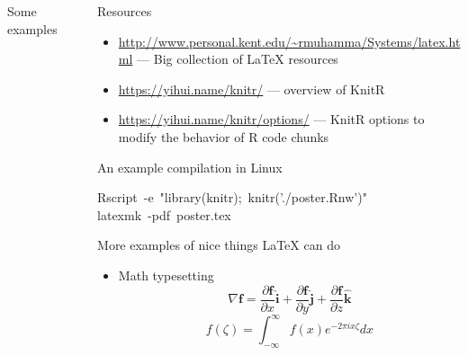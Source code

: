 \documentclass[final]{beamer}\usepackage[]{graphicx}\usepackage[]{color}
\makeatletter
\newcommand{\hlstr}[1]{\textcolor[rgb]{0.192,0.494,0.8}{#1}}%
\newcommand{\hlopt}[1]{\textcolor[rgb]{0,0,0}{#1}}%
\newcommand{\hlstd}[1]{\textcolor[rgb]{0.345,0.345,0.345}{#1}}%
\newenvironment{kframe}{%
 \def\at@end@of@kframe{}%
 \ifinner\ifhmode%
  \def\at@end@of@kframe{\end{minipage}}%
  \begin{minipage}{\columnwidth}%
 \fi\fi%
 \def\FrameCommand##1{\hskip\@totalleftmargin \hskip-\fboxsep
 \colorbox{shadecolor}{##1}\hskip-\fboxsep
     \hskip-\linewidth \hskip-\@totalleftmargin \hskip\columnwidth}%
 \MakeFramed {\advance\hsize-\width
   \@totalleftmargin\z@ \linewidth\hsize
   \@setminipage}}%
 {\par\unskip\endMakeFramed%
 \at@end@of@kframe}
\newenvironment{knitrout}{}{} %
\newlength{\sepwid}
\newlength{\onecolwid}
\newlength{\twocolwid}
\makeatother
\begin{document}
\begin{frame}[t, fragile]
\begin{columns}[T]
\begin{column}{\twocolwid}
\begin{block}{Some examples}
\begin{knitrout}
\end{knitrout}
				\end{block}
		\end{column} %
		\begin{column}{\sepwid} \end{column} %
		\begin{column}{\onecolwid} %
				\begin{block}{Resources}
					\begin{itemize}
						\item \url{http://www.personal.kent.edu/~rmuhamma/Systems/latex.html} --- Big collection of \LaTeX{} resources
						\item \url{https://yihui.name/knitr/} --- overview of KnitR
						\item \url{https://yihui.name/knitr/options/} --- KnitR options to modify the behavior of R code chunks
					\end{itemize}
				\end{block}
				\begin{block}{An example compilation in Linux}
\begin{knitrout}\small
{}\color{fgcolor}\begin{kframe}
\noindent
\ttfamily
\hlstd{Rscript\ }\hlopt{{-}}\hlstd{e\ }\hlstr{"library(knitr);\ knitr('./poster.Rnw')"}\hlstd{\hspace*{\fill}\\
latexmk\ }\hlopt{{-}}\hlstd{pdf\ poster.tex}\hspace*{\fill}
\mbox{}
\normalfont
\end{kframe}
\end{knitrout}
				\end{block}
				\begin{block}{More examples of nice things \LaTeX{} can do}
					\begin{itemize}
							\item Math typesetting
									\begin{equation}
											\nabla \mathbf{f} = \frac{\partial\mathbf{f}}{\partial x}\mathbf{\hat{i}} + \frac{\partial\mathbf{f}}{\partial y}\mathbf{\hat{j}} + \frac{\partial\mathbf{f}}{\partial z}\mathbf{\hat{k}}
									\end{equation}
									\begin{equation}
											f(\zeta) = \int_{-\infty}^{\infty}f(x)e^{-2\pi i x \zeta} dx
									\end{equation}

\end{itemize}
\end{block}
\end{column}
\end{columns}
\end{frame}
\end{document}
